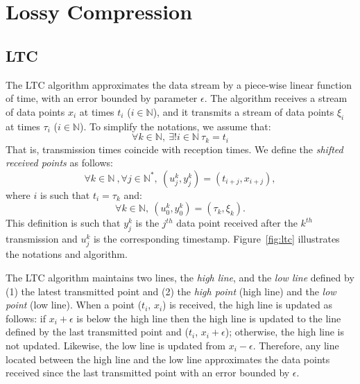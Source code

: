 \section{Lossy Compression}


\subsection{LTC}
The LTC algorithm approximates the data stream by a piece-wise linear function of time, with
an error bounded by parameter $\epsilon$.  The algorithm receives a stream of data points $x_i$ at times $t_i$
($i \in \mathbb{N}$), and it transmits a stream of data points $\xi_i$ at times
$\tau_i$ ($i \in \mathbb{N}$). To simplify the notations, we assume that:
\begin{equation*}
\forall k \in \mathbb{N}, \  \exists ! i \in \mathbb{N} \  \tau_k = t_i
\end{equation*}
That is, transmission times coincide with reception times.
We define the \emph{shifted received points}  as follows:
\begin{equation*}
\forall k \in \mathbb{N}\ , \forall j \in \mathbb{N^*},\ (u^k_j, y^k_j) = (t_{i+j}, x_{i+j}), 
\end{equation*}
where $i$ is such that $t_i = \tau_k$ and:
\begin{equation*}
\forall k \in \mathbb{N},\  (u^k_0, y^k_0) = (\tau_k, \xi_k).
\end{equation*}
This definition is such that $y^k_j$ is the $j^{th}$ data point received
after the $k^{th}$ transmission and $u^k_j$ is the corresponding timestamp.
Figure~\ref{fig:ltc} illustrates the notations and algorithm. 

The LTC algorithm maintains two lines, the \emph{high line}, and the \emph{low
line} defined by (1) the latest transmitted point and (2) the \emph{high point}
(high line) and the \emph{low point} (low line). When a point ($t_i$, $x_i$) is
received, the high line is updated as follows: if $x_i+\epsilon$ is below the
high line then the high line is updated to the line defined by the last
transmitted point and ($t_i$, $x_i+\epsilon$); otherwise, the high line is not
updated. Likewise, the low line is updated from $x_i-\epsilon$. Therefore, any
line located between the high line and the low line approximates the data points
received since the last transmitted point with an error bounded by $\epsilon$.

